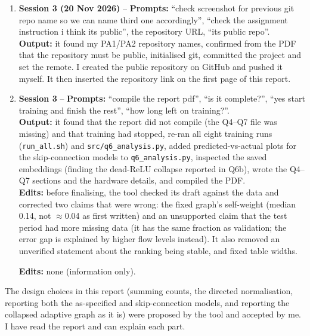 \begin{enumerate}[leftmargin=*]
\item \textbf{Session 3 (20 Nov 2026)} -- \textbf{Prompts:} ``check screenshot for previous git repo name so we can name third one
accordingly'', ``check the assignment instruction i think its public'', the repository URL, ``its public repo''.\\
\textbf{Output:} it found my PA1/PA2 repository names, confirmed from the PDF that the repository must be public, initialised git,
committed the project and set the remote. I created the public repository on GitHub and pushed it myself.
It then inserted the repository link on the first page of this report.

\item \textbf{Session 3} -- \textbf{Prompts:} ``compile the report pdf'', ``is it complete?'', ``yes start training and finish the rest'',
``how long left on training?''.\\
\textbf{Output:} it found that the report did not compile (the Q4--Q7 file was missing) and that training had stopped, re-ran all
eight training runs (\texttt{run\_all.sh}) and \texttt{src/q6\_analysis.py}, added predicted-vs-actual plots for the skip-connection
models to \texttt{q6\_analysis.py}, inspected the saved embeddings (finding the dead-ReLU collapse reported in Q6b), wrote the
Q4--Q7 sections and the hardware details, and compiled the PDF.\\
\textbf{Edits:} before finalising, the tool checked its draft against the data and corrected two claims that were wrong:
the fixed graph's self-weight (median 0.14, not $\approx$0.04 as first written) and an unsupported claim that the test
period had more missing data (it has the same fraction as validation; the error gap is explained by higher flow levels instead).
It also removed an unverified statement about the ranking being stable, and fixed table widths.

\textbf{Edits:} none (information only).
\end{enumerate}

\noindent The design choices in this report (summing counts, the directed normalisation, reporting both the as-specified and skip-connection
models, and reporting the collapsed adaptive graph as it is) were proposed by the tool and accepted by me. I have read the report and
can explain each part.
